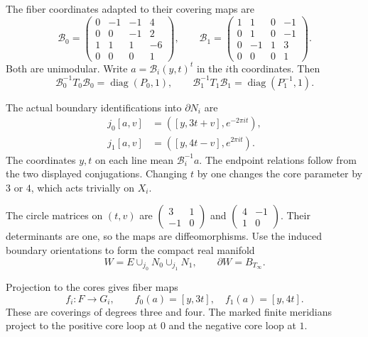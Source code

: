 The fiber coordinates adapted to their covering maps are
\begin{equation}\label{mt:eq:B}
\mathcal B_0=\begin{pmatrix}0&-1&-1&4\\0&0&-1&2\\1&1&1&-6\\0&0&0&1\end{pmatrix},\qquad
\mathcal B_1=\begin{pmatrix}1&1&0&-1\\0&1&0&-1\\0&-1&1&3\\0&0&0&1\end{pmatrix}.
\end{equation}
Both are unimodular. Write $a=\mathcal B_i(y,t)^t$ in the $i$th coordinates.
Then
\[
\mathcal B_0^{-1}T_0\mathcal B_0=\operatorname{diag}(P_0,1),\qquad
\mathcal B_1^{-1}T_1\mathcal B_1=\operatorname{diag}(P_1^{-1},1).
\]

The actual boundary identifications into $\partial N_i$ are
\begin{equation}\label{mt:eq:j}
\begin{aligned}
j_0[a,v]&=([y,3t+v],e^{-2\pi it}),\\
j_1[a,v]&=([y,4t-v],e^{2\pi it}).
\end{aligned}
\end{equation}
The coordinates $y,t$ on each line mean $\mathcal B_i^{-1}a$.
The endpoint relations follow from the two displayed conjugations.
Changing $t$ by one changes the core parameter by $3$ or $4$,
which acts trivially on $X_i$.

The circle matrices on $(t,v)$ are
$\left(\begin{smallmatrix}3&1\\-1&0\end{smallmatrix}\right)$ and
$\left(\begin{smallmatrix}4&-1\\1&0\end{smallmatrix}\right)$.
Their determinants are one, so the maps are diffeomorphisms.
Use the induced boundary orientations to form the compact real manifold
\begin{equation}\label{mt:eq:W}
W=E\cup_{j_0}N_0\cup_{j_1}N_1,\qquad \partial W=B_{T_\infty}.
\end{equation}

Projection to the cores gives fiber maps
\begin{equation}\label{mt:eq:f}
f_i:F\longrightarrow G_i,\qquad
f_0(a)=[y,3t],\quad f_1(a)=[y,4t].
\end{equation}
These are coverings of degrees three and four.
The marked finite meridians project to the positive core loop at $0$
and the negative core loop at $1$.

